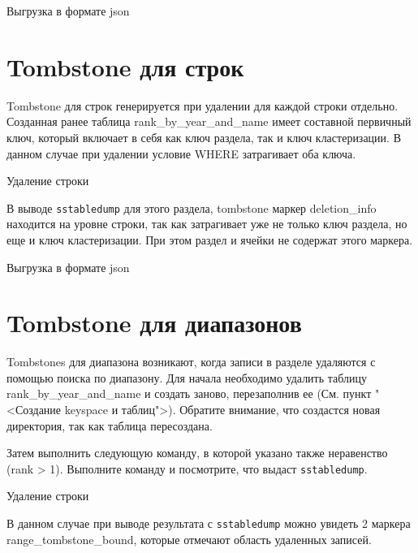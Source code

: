 \begin{image}
	\caption{Выгрузка в формате json}
	\label{fig:sstabledump:partition:delete}
\end{image}

\section{Tombstone для строк}

Tombstone для строк генерируется при удалении для каждой строки
отдельно. Созданная ранее таблица rank\_by\_year\_and\_name имеет
составной первичный ключ, который включает в себя как ключ раздела, так и
ключ кластеризации. В данном случае при удалении условие WHERE
затрагивает оба ключа.

\begin{image}
	\caption{Удаление строки}
	\label{fig:cqlsh:line:delete}
\end{image}

В выводе \texttt{sstabledump} для этого раздела,
tombstone маркер deletion\_info находится на уровне строки,
так как затрагивает уже не только ключ раздела, но еще и ключ кластеризации.
При этом раздел и ячейки не содержат этого маркера.

\begin{image}
	\caption{Выгрузка в формате json}
	\label{fig:sstabledump:line:delete}
\end{image}

\section{Tombstone для диапазонов}

Tombstones для диапазона возникают, когда записи в разделе удаляются с
помощью поиска по диапазону. Для начала необходимо удалить таблицу
rank\_by\_year\_and\_name и создать заново, перезаполнив ее (См. пункт
"<Создание keyspace и таблиц">). Обратите внимание, что создастся новая
директория, так как таблица пересоздана.\par
Затем выполнить следующую команду, в которой указано также
неравенство (rank > 1). Выполните команду и посмотрите, что выдаст
\texttt{sstabledump}.

\begin{image}
	\caption{Удаление строки}
	\label{fig:cqlsh:range:delete}
\end{image}

В данном случае при выводе результата с \texttt{sstabledump} можно увидеть 2
маркера range\_tombstone\_bound, которые отмечают область удаленных записей.

